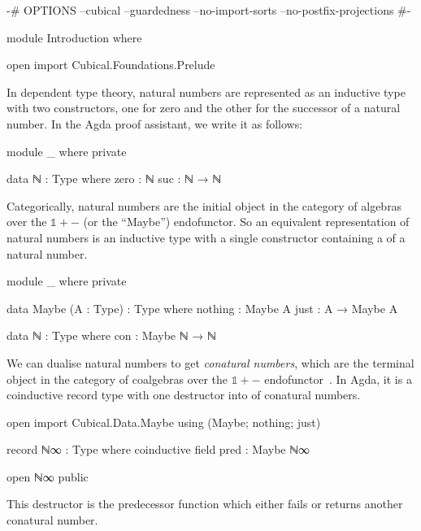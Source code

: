 \begin{code}[hide]
{-# OPTIONS --cubical --guardedness --no-import-sorts --no-postfix-projections #-}

module Introduction where

open import Cubical.Foundations.Prelude
\end{code}
In dependent type theory, natural numbers are represented as an inductive type
with two constructors, one for zero and the other for the successor of a natural
number. In the Agda proof assistant, we write it as follows:
\begin{code}[hide]
module _ where private
\end{code}
\begin{code}
  data ℕ : Type where
    zero  :      ℕ
    suc   : ℕ →  ℕ
\end{code}
Categorically, natural numbers are the initial object in the category of
algebras over the $\mathbb{1} + {-}$ (or the ``Maybe'') endofunctor. So an
equivalent representation of natural numbers is an inductive type with a single
constructor containing a  of a natural number.
\begin{code}[hide]
module _ where private
\end{code}
\begin{code}
  data Maybe (A : Type) : Type where
    nothing  :      Maybe A
    just     : A →  Maybe A

  data ℕ : Type where
    con : Maybe ℕ → ℕ
\end{code}

We can dualise natural numbers to get \emph{conatural numbers}, which are the
terminal object in the category of coalgebras over the $\mathbb{1} + {-}$
endofunctor~\cite{hagino-categorical}. In Agda, it is a coinductive record type
with one destructor into  of conatural numbers.
\begin{code}[hide]
open import Cubical.Data.Maybe using (Maybe; nothing; just)
\end{code}
\begin{code}
record ℕ∞ : Type where
  coinductive
  field
    pred : Maybe ℕ∞
\end{code}
\begin{code}[hide]
open ℕ∞ public
\end{code}
This destructor is the predecessor function which either fails or returns
another conatural number.

